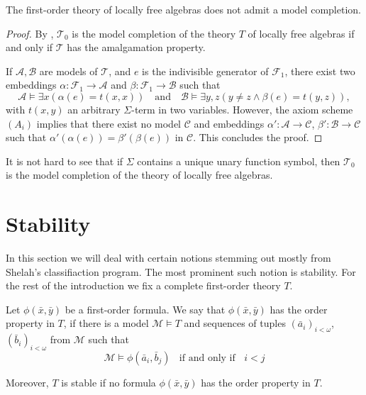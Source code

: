 \documentclass[a4paper,11pt]{article}
\newcommand{\cspace}{~}
\begin{document}
\begin{proposition}
    The first-order theory of locally free algebras does not admit a model completion.
\end{proposition}
\begin{proof}
By \cite[Proposition\cspace3.5.18]{ChangKeisler1990ModelTheory}, $\mathcal{T}_0$ is the model completion of the theory $T$ of locally free algebras if and only if $\mathcal{T}$ has the amalgamation property. 

If $\mathcal{A},\mathcal{B}$ are models of $\mathcal{T}$, and $e$ is the indivisible generator of $\mathcal{F}_1$, there exist two embeddings $\alpha:\mathcal{F}_1\rightarrow\mathcal{A}$ and $\beta:\mathcal{F}_1\rightarrow\mathcal{B}$ such that 
    \begin{equation*}
        \mathcal{A}\models \exists x\left(\alpha(e)=t(x,x)\right)\quad\text{and}\quad\mathcal{B}\models\exists y,z\left(y\neq z \wedge\beta(e)=t(y,z)\right),
    \end{equation*}
    \noindent
    with $t(x,y)$ an arbitrary $\Sigma$-term in two variables. However, the axiom scheme $(A_i)$ implies that there exist no model $\mathcal{C}$ and embeddings $\alpha':\mathcal{A}\rightarrow \mathcal{C}$, $\beta':\mathcal{B}\rightarrow\mathcal{C}$ such that $\alpha'(\alpha(e))=\beta'(\beta(e))$ in $\mathcal{C}$. This concludes the proof.
\end{proof}

\begin{remark}
It is not hard to see that if $\Sigma$ contains a unique unary function symbol, then $\mathcal{T}_0$ is the model completion of the theory of locally free algebras. 
\end{remark}

\section{Stability}
In this section we will deal with certain notions stemming out mostly from Shelah's classifiaction program. The most prominent such notion is stability. For the rest of the introduction we fix a complete first-order theory $T$. 

\begin{definition}
Let $\phi(\bar x, \bar y)$ be a first-order formula. We say that $\phi(\bar x, \bar y)$ has the order property in $T$, if there is a model $\mathcal{M}\models T$ and sequences of tuples $(\bar a_i)_{i<\omega}$, $(\bar b_i)_{i<\omega}$ from $\mathcal{M}$ such that 
\begin{equation} \mathcal{M}\models \phi(\bar a_i, \bar b_j) \ \ \ \ \textrm{if and only if} \ \ \ \ i<j
\label{order}
\end{equation}

Moreover, $T$ is stable if no formula $\phi(\bar x, \bar y)$ has the order property in $T$.
\end{definition}
\end{document}
